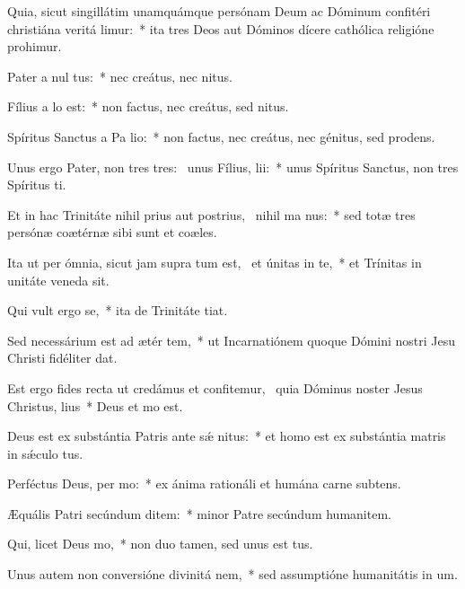 \item Quia, sicut singillátim unamquámque persónam Deum ac Dóminum confitéri christiána veritá limur:~* ita tres Deos aut Dóminos dícere cathólica religióne prohimur.
\item Pater a nul  tus:~* nec creátus, nec nitus.
\item Fílius a  lo est:~* non factus, nec creátus, sed nitus.
\item Spíritus Sanctus a Pa  lio:~* non factus, nec creátus, nec génitus, sed prodens.
\item Unus ergo Pater, non tres tres:~\pscross{} unus Fílius,   lii:~* unus Spíritus Sanctus, non tres Spíritus ti.
\item Et in hac Trinitáte nihil prius aut postrius,~\pscross{} nihil ma  nus:~* sed totæ tres persónæ coætérnæ sibi sunt et coæles.
\item Ita ut per ómnia, sicut jam supra tum est,~\pscross{} et únitas in te,~* et Trínitas in unitáte veneda sit.
\item Qui vult ergo  se,~* ita de Trinitáte tiat.
\item Sed necessárium est ad ætér tem,~* ut Incarnatiónem quoque Dómini nostri Jesu Christi fidéliter dat.
\item Est ergo fides recta ut credámus et confitemur,~\pscross{} quia Dóminus noster Jesus Christus,  lius~* Deus et mo est.
\item Deus est ex substántia Patris ante sǽ nitus:~* et homo est ex substántia matris in sǽculo tus.
\item Perféctus Deus, per mo:~* ex ánima rationáli et humána carne subtens.
\item Æquális Patri secúndum ditem:~* minor Patre secúndum humanitem.
\item Qui, licet Deus   mo,~* non duo tamen, sed unus est tus.
\item Unus autem non conversióne divinitá  nem,~* sed assumptióne humanitátis in um.
